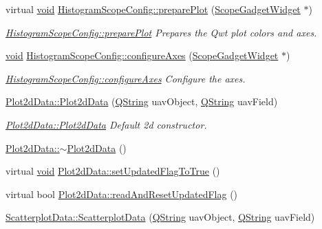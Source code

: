 \begin{DoxyCompactItemize}
virtual \hyperlink{group___u_a_v_objects_plugin_ga444cf2ff3f0ecbe028adce838d373f5c}{void} \hyperlink{group___scope_plugin_gaaf43bfcb7e79e657acda463cb66d854c}{\-Histogram\-Scope\-Config\-::prepare\-Plot} (\hyperlink{class_scope_gadget_widget}{\-Scope\-Gadget\-Widget} $\ast$)
\begin{DoxyCompactList}\small\item\em \hyperlink{group___scope_plugin_gaaf43bfcb7e79e657acda463cb66d854c}{\-Histogram\-Scope\-Config\-::prepare\-Plot} \-Prepares the \-Qwt plot colors and axes. \end{DoxyCompactList}\item 
\hyperlink{group___u_a_v_objects_plugin_ga444cf2ff3f0ecbe028adce838d373f5c}{void} \hyperlink{group___scope_plugin_ga522d6d5e834566550cacdb1eb24b934f}{\-Histogram\-Scope\-Config\-::configure\-Axes} (\hyperlink{class_scope_gadget_widget}{\-Scope\-Gadget\-Widget} $\ast$)
\begin{DoxyCompactList}\small\item\em \hyperlink{group___scope_plugin_ga522d6d5e834566550cacdb1eb24b934f}{\-Histogram\-Scope\-Config\-::configure\-Axes} \-Configure the axes. \end{DoxyCompactList}\item 
\hyperlink{group___scope_plugin_ga47355d48ebe2a3f10f3eeb8c885d91d2}{\-Plot2d\-Data\-::\-Plot2d\-Data} (\hyperlink{group___u_a_v_objects_plugin_gab9d252f49c333c94a72f97ce3105a32d}{\-Q\-String} uav\-Object, \hyperlink{group___u_a_v_objects_plugin_gab9d252f49c333c94a72f97ce3105a32d}{\-Q\-String} uav\-Field)
\begin{DoxyCompactList}\small\item\em \hyperlink{group___scope_plugin_ga47355d48ebe2a3f10f3eeb8c885d91d2}{\-Plot2d\-Data\-::\-Plot2d\-Data} \-Default 2d constructor. \end{DoxyCompactList}\item 
\hyperlink{group___scope_plugin_ga7e60665e7c88b1df55cfefe356d8ee27}{\-Plot2d\-Data\-::$\sim$\-Plot2d\-Data} ()
\item 
virtual \hyperlink{group___u_a_v_objects_plugin_ga444cf2ff3f0ecbe028adce838d373f5c}{void} \hyperlink{group___scope_plugin_ga8cf81c5a6f87fc1c97b0054f2cb23f90}{\-Plot2d\-Data\-::set\-Updated\-Flag\-To\-True} ()
\item 
virtual bool \hyperlink{group___scope_plugin_ga5fe24bb29fc32dfa2f955383dc96877e}{\-Plot2d\-Data\-::read\-And\-Reset\-Updated\-Flag} ()
\item 
\hyperlink{group___scope_plugin_ga1e171be371a5e44f814dc012e182f99b}{\-Scatterplot\-Data\-::\-Scatterplot\-Data} (\hyperlink{group___u_a_v_objects_plugin_gab9d252f49c333c94a72f97ce3105a32d}{\-Q\-String} uav\-Object, \hyperlink{group___u_a_v_objects_plugin_gab9d252f49c333c94a72f97ce3105a32d}{\-Q\-String} uav\-Field)

\end{DoxyCompactItemize}
